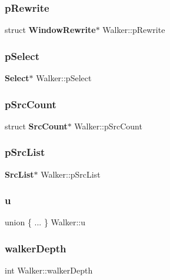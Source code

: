 \mbox{\label{struct_walker_ad85088e268eee2a9357e00a85d0e11bf}} 
\subsubsection{pRewrite}
{\footnotesize\ttfamily struct \textbf{ Window\+Rewrite}$\ast$ Walker\+::p\+Rewrite}

\mbox{\label{struct_walker_a660213ef8927c88c231102952fe66565}} 
\subsubsection{pSelect}
{\footnotesize\ttfamily \textbf{ Select}$\ast$ Walker\+::p\+Select}

\mbox{\label{struct_walker_a4bdd17ab02d057797f9f9e8735bdc6f3}} 
\subsubsection{pSrcCount}
{\footnotesize\ttfamily struct \textbf{ Src\+Count}$\ast$ Walker\+::p\+Src\+Count}

\mbox{\label{struct_walker_aa09fe5df040b732226cdae1bff741e0d}} 
\subsubsection{pSrcList}
{\footnotesize\ttfamily \textbf{ Src\+List}$\ast$ Walker\+::p\+Src\+List}

\mbox{\label{struct_walker_a07ebbe6b6f1051d573c521ec7eaca250}} 
\subsubsection{u}
{\footnotesize\ttfamily union \{ ... \}   Walker\+::u}

\mbox{\label{struct_walker_a1183df46d2b0ecac73e76336067cf207}} 
\subsubsection{walkerDepth}
{\footnotesize\ttfamily int Walker\+::walker\+Depth}

